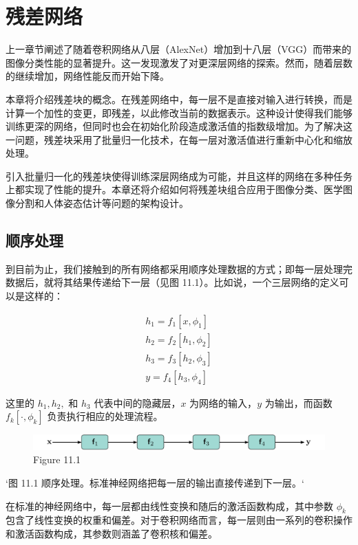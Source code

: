 \chapter{残差网络}

上一章节阐述了随着卷积网络从八层（AlexNet）增加到十八层（VGG）而带来的图像分类性能的显著提升。这一发现激发了对更深层网络的探索。然而，随着层数的继续增加，网络性能反而开始下降。

本章将介绍残差块的概念。在残差网络中，每一层不是直接对输入进行转换，而是计算一个加性的变更，即残差，以此修改当前的数据表示。这种设计使得我们能够训练更深的网络，但同时也会在初始化阶段造成激活值的指数级增加。为了解决这一问题，残差块采用了批量归一化技术，在每一层对激活值进行重新中心化和缩放处理。

引入批量归一化的残差块使得训练深层网络成为可能，并且这样的网络在多种任务上都实现了性能的提升。本章还将介绍如何将残差块组合应用于图像分类、医学图像分割和人体姿态估计等问题的架构设计。
\section{顺序处理}
到目前为止，我们接触到的所有网络都采用顺序处理数据的方式；即每一层处理完数据后，就将其结果传递给下一层（见图 11.1）。比如说，一个三层网络的定义可以是这样的：


\begin{align}
h_1 = f_1[x, \phi_1] \\
h_2 = f_2[h_1, \phi_2] \\
h_3 = f_3[h_2, \phi_3] \\
y = f_4[h_3, \phi_4]
\end{align} 


这里的 \(h_1, h_2,\) 和 \(h_3\) 代表中间的隐藏层，\(x\) 为网络的输入，\(y\) 为输出，而函数 \(f_k[\cdot, \phi_k]\) 负责执行相应的处理流程。

\begin{figure}[h!]
\centering
\includegraphics[width=0.7\linewidth]{png/chapter11/ResidualSequential.png}
\caption{Figure 11.1}
\end{figure}


`图 11.1 顺序处理。标准神经网络把每一层的输出直接传递到下一层。`

在标准的神经网络中，每一层都由线性变换和随后的激活函数构成，其中参数 \(\phi_k\) 包含了线性变换的权重和偏差。对于卷积网络而言，每一层则由一系列的卷积操作和激活函数构成，其参数则涵盖了卷积核和偏差。

